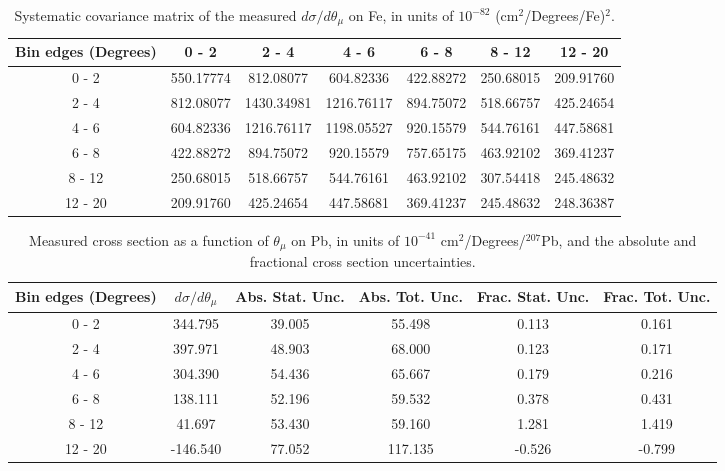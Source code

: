 \documentclass[aps,prl,twocolumn,superscriptaddress,nofootinbib]{revtex4-1}
\begin{document}
\begin{table}[h!]
  \centering
  \caption{Systematic covariance matrix of the measured $d\sigma/d\theta_{\mu}$ on Fe, in units of $10^{-82}$ (cm$^{2}$/Degrees/Fe)$^{2}$.}
    \begin{tabular}{c||cccccc}
      Bin edges (Degrees) & 0 - 2 & 2 - 4 & 4 - 6 & 6 - 8 & 8 - 12 & 12 - 20 \\
\hline \hline
        0 - 2 & 550.17774 & 812.08077 & 604.82336 & 422.88272 & 250.68015 & 209.91760 \\
        2 - 4 & 812.08077 & 1430.34981 & 1216.76117 & 894.75072 & 518.66757 & 425.24654 \\
        4 - 6 & 604.82336 & 1216.76117 & 1198.05527 & 920.15579 & 544.76161 & 447.58681 \\
        6 - 8 & 422.88272 & 894.75072 & 920.15579 & 757.65175 & 463.92102 & 369.41237 \\
       8 - 12 & 250.68015 & 518.66757 & 544.76161 & 463.92102 & 307.54418 & 245.48632 \\
      12 - 20 & 209.91760 & 425.24654 & 447.58681 & 369.41237 & 245.48632 & 248.36387 \\
    \end{tabular}
  \label{tablecov:Fe_Systematic_ThetaMu}
\end{table}

\begin{table}[h!]
  \centering
  \caption{Measured cross section as a function of $\theta_{\mu}$ on Pb, in units of
  $10^{-41}$ $\text{cm}^{2}$/Degrees/$^{207}$Pb, and the absolute and
  fractional cross section uncertainties.}
    \begin{tabular}{c||c||c|c||c|c}
      Bin edges (Degrees)  &  $d\sigma/d\theta_{\mu}$  &  Abs. Stat. Unc. & Abs. Tot. Unc.  &  Frac. Stat. Unc.  &  Frac. Tot. Unc. \\
      \hline\hline
        0 - 2 & 344.795 & 39.005 & 55.498 & 0.113 & 0.161 \\
        2 - 4 & 397.971 & 48.903 & 68.000 & 0.123 & 0.171 \\
        4 - 6 & 304.390 & 54.436 & 65.667 & 0.179 & 0.216 \\
        6 - 8 & 138.111 & 52.196 & 59.532 & 0.378 & 0.431 \\
       8 - 12 & 41.697 & 53.430 & 59.160 & 1.281 & 1.419 \\
      12 - 20 & -146.540 & 77.052 & 117.135 & -0.526 & -0.799 \\
    \end{tabular}
  \label{table:ThetaMuXSec_Pb}
\end{table}
\end{document}
